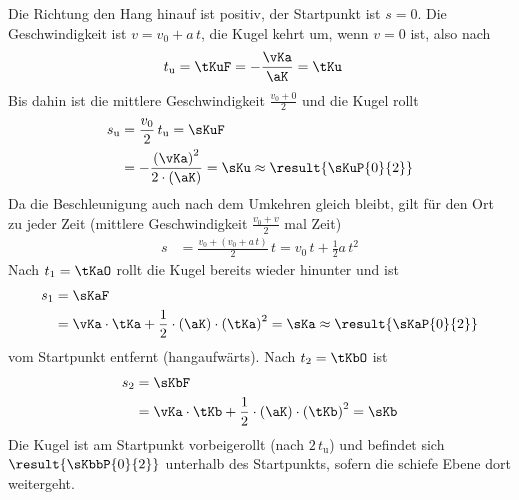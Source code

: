 \begin{center}
\end{center}

Die Richtung den Hang hinauf ist positiv, der Startpunkt ist $s = 0$. Die Geschwindigkeit ist $v = v_0 + a\,t$, die Kugel kehrt um, wenn $v = 0$ ist, also nach
\begin{align}
 t_\mathrm{u} &= \tKuF = -\frac{\vKa}{\aK} = \tKu
\end{align}
Bis dahin ist die mittlere Geschwindigkeit $\frac{v_0+0}{2}$ und die Kugel rollt
\begin{align}
 s_\mathrm{u} &= \frac{v_0}{2}\,t_\mathrm{u} = \sKuF \\
   &= -\frac{\left(\vKa\right)^2}{2\cdot\left(\aK\right)} = \sKu \approx \result{\sKuP{0}{2}}
\end{align}
Da die Beschleunigung auch nach dem Umkehren gleich bleibt, gilt für den Ort zu jeder Zeit (mittlere Geschwindigkeit $\frac{v_0+v}{2}$ mal Zeit)
\begin{align}
 s &= \frac{v_0+\left(v_0+a\,t\right)}{2}\,t = v_0\,t+\frac{1}{2}a\,t^2
\end{align}
Nach $t_1 = \tKaO$ rollt die Kugel bereits wieder hinunter und ist
\begin{align}
 s_1 &= \sKaF \\
   &= \vKa\cdot\tKa+\frac{1}{2}\cdot\left(\aK\right)\cdot\left(\tKa\right)^2 = \sKa \approx \result{\sKaP{0}{2}}
\end{align}
vom Startpunkt entfernt (hangaufwärts). Nach $t_2 = \tKbO$ ist
\begin{align}
 s_2 &= \sKbF \\
   &= \vKa\cdot\tKb+\frac{1}{2}\cdot\left(\aK\right)\cdot\left(\tKb\right)^2 = \sKb
\end{align}
Die Kugel ist am Startpunkt vorbeigerollt (nach $2\,t_\mathrm{u}$) und befindet sich $\result{\sKbbP{0}{2}}$ unterhalb des Startpunkts, sofern die schiefe Ebene dort weitergeht.
